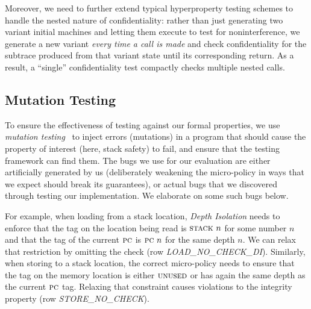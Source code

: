 \documentclass[10pt,conference]{ieeetran}%
\theoremstyle{definition}
\begin{document}
Moreover, we need to further extend typical hyperproperty testing
schemes to handle the nested nature of confidentiality: rather than
just generating two variant initial machines
and letting them execute to test for noninterference, we generate a
new variant {\em every time a call is made} and check confidentiality
for the subtrace produced from that variant state until its
corresponding return. As a result, a ``single'' confidentiality test
compactly checks multiple nested calls.


\subsection{Mutation Testing}

To ensure the effectiveness of testing against our formal properties, we
use {\em mutation testing}~\cite{JiaH11} to inject errors
(mutations) in a program that should cause the property of interest (here,
stack safety) to fail, and ensure that the testing framework can find
them. The bugs we use for our evaluation are either artificially generated
by us (deliberately weakening the micro-policy in ways that we expect
should break its guarantees), or actual bugs that we discovered through
testing our implementation. We elaborate on some such bugs below.

For example, when loading from a stack location, {\em Depth Isolation}
needs to enforce that the tag on the location being read
is $\textsc{stack} ~ n$ for some number $n$ and that the tag of the
current $\textsc{pc}$ is $\textsc{pc} ~ n$ for the same depth $n$. We can relax
that restriction by omitting the check (row {\em
  LOAD\_NO\_CHECK\_DI}).
%
Similarly, when storing to a stack location, the correct micro-policy
needs to ensure that the tag on the memory location is either
$\textsc{unused}$ or has again the same depth as the current $\textsc{pc}$
tag. Relaxing that constraint causes violations to the integrity
property (row {\em STORE\_NO\_CHECK}).
\end{document}

